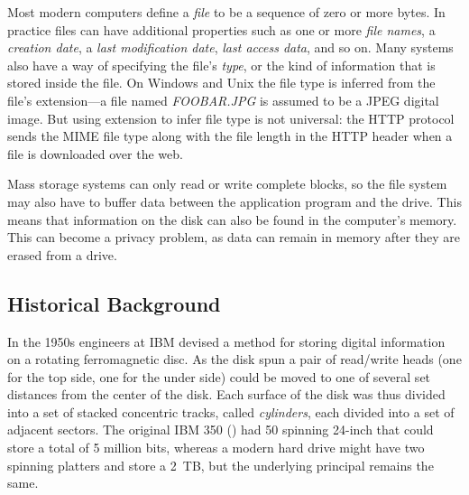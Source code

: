 Most modern computers define a \emph{file} to be a sequence of zero or more
bytes. In practice files can have additional properties such as one or
more \emph{file names}, a \emph{creation date}, a \emph{last modification date},
\emph{last access data}, and so on. Many systems also have a way of
specifying the file's \emph{type}, or the kind of information that is
stored inside the file. On Windows and Unix the file type is
inferred from the file's extension---a file named
\emph{FOOBAR.JPG} is assumed to be a JPEG digital image. But using
extension to infer file type is not universal: the HTTP protocol sends
the MIME file type along with the file length in the HTTP header when
a file is downloaded over the web.

Mass storage systems can only read or write complete blocks, so the
file system may also have to buffer data between the application
program and the drive. This means that information on the disk can
also be found in the computer's memory. This can become a privacy
problem, as  data can remain in memory  after they are erased from
a drive.


\subsection{Historical Background}
In the 1950s engineers at IBM devised a method for storing digital
information on a rotating ferromagnetic disc. As the disk spun a pair
of read/write heads (one for the top side, one for the under side)
could be moved to one of several set distances from the center of the
disk. Each surface of the disk was thus divided into a set of stacked
concentric tracks, called \emph{cylinders}, each divided into a set of
adjacent sectors. The original IBM 350 () had 50 spinning 24-inch that
could store a total of 5 million bits, whereas a modern
hard drive might have two spinning platters and store a 2~TB, but the
underlying principal remains the same. 



